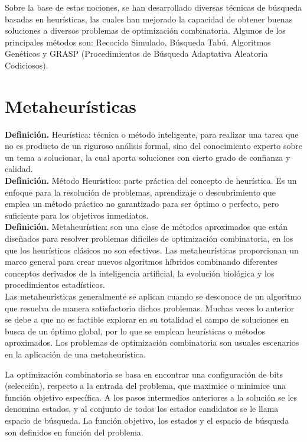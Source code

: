 \documentclass[a4paper,12pt]{book}
\begin{document}
	Sobre la base de estas nociones, se han desarrollado diversas técnicas de búsqueda basadas en heurísticas, las cuales han mejorado la capacidad de obtener buenas soluciones a diversos problemas de optimización combinatoria. Algunos de los principales métodos son: Recocido Simulado, Búsqueda Tabú, Algoritmos Genéticos y GRASP (Procedimientos de Búsqueda Adaptativa Aleatoria Codiciosos).
	
	\section{Metaheurísticas}
	
	\textbf{Definición.} Heurística: técnica o método inteligente, para realizar una tarea que no es producto de un riguroso análisis formal, sino del conocimiento experto sobre un tema a solucionar, la cual aporta soluciones con cierto grado de confianza y calidad. \\
	
	\textbf{Definición.} Método Heurístico: parte práctica del concepto de heurística. Es un enfoque para la resolución de problemas, aprendizaje o descubrimiento que emplea un método práctico no garantizado para ser óptimo o perfecto, pero suficiente para los objetivos inmediatos. \\
	
	\textbf{Definición.} Metaheurística: son una clase de métodos aproximados que están diseñados para resolver problemas difíciles de optimización combinatoria, en los que los heurísticos clásicos no son efectivos. Las metaheurísticas proporcionan un marco general para crear nuevos algoritmos híbridos combinando diferentes conceptos derivados de la inteligencia artificial, la evolución biológica y los procedimientos estadísticos. \\
	
	Las metaheurísticas generalmente se aplican cuando se desconoce de un algoritmo que resuelva de manera satisfactoria dichos problemas. Muchas veces lo anterior se debe a que no es factible explorar en su totalidad el campo de soluciones en busca de un óptimo global, por lo que se emplean heurísticas o métodos aproximados. Los problemas de optimización combinatoria son usuales escenarios en la aplicación de una metaheurística.
	
	La optimización combinatoria se basa en encontrar una configuración de bits (selección), respecto a la entrada del problema, que maximice o minimice una función objetivo específica. A los pasos intermedios anteriores a la solución se les denomina estados, y al conjunto de todos los estados candidatos se le llama espacio de búsqueda. La función objetivo, los estados y el espacio de búsqueda son definidos en función del problema.
	
\end{document}
